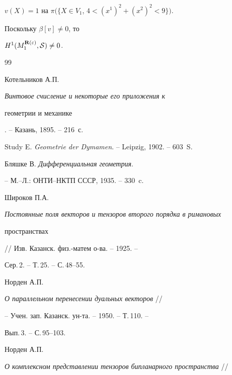 $v(X)=1$ на $\pi(\{X\in V_1$, $4<(x^1)^2+(x^2)^2<9\})$.


Поскольку $\beta[v]\ne 0$, то


$H^1(M_1^{{\bold R}(\varepsilon)},{\cal S})\ne 0$.








\begin{thebibliography}{99}







Котельников А.П.


{\it Винтовое счисление и некоторые его приложения к


геометрии и механике}. -- Казань, 1895. -- 216~с.







Study E. {\it Geometrie der Dymamen}. -- Leipzig, 1902. -- 603~S.







Бляшке В. {\it Дифференциальная геометрия}.


-- М.--Л.: ОНТИ--НКТП СССР, 1935. -- 330~c.







Широков П.А.


{\it Постоянные поля векторов и тензоров второго порядка в римановых


пространствах} // Изв. Казанск. физ.-матем о-ва. -- 1925. --


Сер.\,2. -- Т.\,25. -- С.\,48--55.







Норден А.П.


{\it О параллельном перенесении дуальных векторов} //


-- Учен. зап. Казанск. ун-та. -- 1950. -- Т.\,110. --


Вып.\,3. --  С.\,95--103.







Норден А.П.


{\it О комплексном представлении тензоров бипланарного пространства} //



\end{thebibliography}
